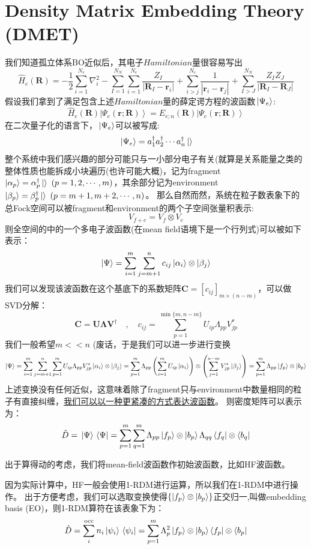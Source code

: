 \section{Density Matrix Embedding Theory (DMET)}
我们知道孤立体系BO近似后，其电子$Hamiltonian$量很容易写出
\[\hat{H}_e(\mathbf{R})=-\frac{1}{2}\sum_{i=1}^{N_e}\nabla_i^2-\sum_{I=1}^{N_N}\sum_{i=1}^{N_e}\frac{Z_I}{|\mathbf{R}_I-\mathbf{r}_i|}+\sum_{i>j}^{N_e}\frac{1}{|\mathbf{r}_i-\mathbf{r}_j|}+\sum_{I>J}^{N_N}\frac{Z_IZ_J}{|\mathbf{R}_I-\mathbf{R}_J|} \tag{1}\]
假设我们拿到了满足包含上述$Hamiltonian$量的薛定谔方程的波函数$\ket*{\Psi_e}$:
\[\hat{H}_e(\mathbf{R})\left|\Psi_e(\mathbf{r};\mathbf{R})\right\rangle=E_{e;n}(\mathbf{R})\left|\Psi_e(\mathbf{r};\mathbf{R})\right\rangle \]
在二次量子化的语言下，$\ket*{\Psi_e}$可以被写成:
\[\ket*{\Psi_e}=a_1^{\dagger}a_2^{\dagger}\cdots a_n^{\dagger}\ket{}\]
整个系统中我们感兴趣的部分可能只与一小部分电子有关(就算是关系能量之类的整体性质也能拆成小块遍历(也许可能大概)，记为fragment $\ket{\alpha_p}=\alpha_p^{\dagger}\ket{} \ (p=1,2,\cdots,m)$，其余部分记为environment $\ket{\beta_p}=\beta_p^{\dagger}\ket{} \ (p=m+1,m+2,\cdots,n)$。
那么自然而然，系统在粒子数表象下的总Fock空间可以被fragment和environment的两个子空间张量积表示:
\[V_{f+e} = V_f \otimes V_e\]
则全空间的中的一个多电子波函数(在mean field语境下是一个行列式)可以被如下表示：
\[\ket{\Psi}=\sum_{i=1}^{m}\sum_{j=m+1}^{n}c_{ij}\ket{\alpha_i}\otimes\ket{\beta_j}\]
我们可以发现该波函数在这个基底下的系数矩阵$\mathbf{C}=[c_{ij}]_{m \times (n-m)}$，可以做SVD分解：
\[\mathbf{C}=\mathbf{U}\mathbf{\Lambda}\mathbf{V}^{\dagger} \quad , \quad c_{ij}=\sum_{p=1}^{\min\{m,n-m\}}U_{ip}\Lambda_{pp}V_{jp}^*\]
我们一般希望$m<<n$ (废话，于是我们可以进一步进行变换
\[\ket{\Psi}=\sum_{i=1}^{m}\sum_{j=m+1}^{n}\sum_{p=1}^mU_{ip}\Lambda_{pp}V_{jp}^*\ket{\alpha_i}\otimes\ket{\beta_j}=\sum_{p=1}^{m}\Lambda_{pp}\left(\sum_{i=1}^{m}U_{ip}\left|\alpha_i\right>\right)\otimes\left(\sum_{j=1}^{n-m}V_{jp}^*\left|\beta_j\right>\right)=\sum_{p=1}^m\Lambda_{pp}\ket{f_p}\otimes\ket{b_p}\]
上述变换没有任何近似，这意味着除了fragment只与environment中数量相同的粒子有直接纠缠，\href{https://dspace.mit.edu/handle/1721.1/147265}{我们可以以一种更紧凑的方式表达波函数}。
则密度矩阵可以表示为：
\[\hat{D}=\ket*{\Psi}\bra*{\Psi} = \sum_{p=1}^m \sum_{q=1}^m \Lambda_{pp}\ket{f_p}\otimes\ket{b_p}\Lambda_{qq}\bra{f_q}\otimes\bra{b_q}\]

出于算得动的考虑，我们将mean-field波函数作初始波函数，比如HF波函数。

因为实际计算中，HF一般会使用1-RDM进行运算，所以我们在1-RDM中进行操作。
出于方便考虑，我们可以选取变换使得$\{\ket{f_p}\otimes\ket{b_p}\}$正交归一,叫做embedding basis (EO)，则1-RDM算符在该表象下为：
\[\hat{D}=\sum_i^{\text{occ}}n_i\ket*{\psi_i}\bra*{\psi_i} = \sum_{p=1}^m \Lambda_{p}^2\ket{f_p}\otimes\ket{b_p}\bra{f_p}\otimes\bra{b_p}\]

